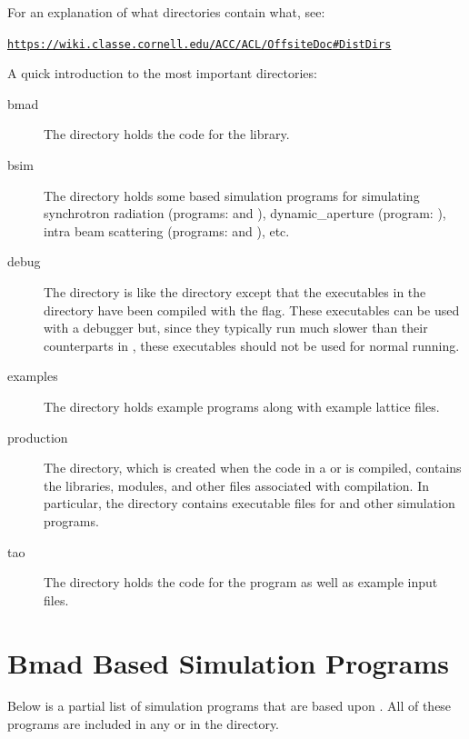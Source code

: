 \documentclass{hitec}
\newenvironment{display}
  {\vspace*{-1.5ex} \begin{alltt}}
  {\end{alltt} \vspace*{-1.0ex}}
\begin{document}
For an explanation of what directories contain what, see:
\begin{display}
  \url{https://wiki.classe.cornell.edu/ACC/ACL/OffsiteDoc#DistDirs}
\end{display}

A quick introduction to the most important directories:
  \begin{description}
  \item[bmad] \Newline
The  directory holds the code for the \bmad library.
  \item[bsim] \Newline
The  directory holds some \bmad based simulation programs for simulating
synchrotron radiation (programs:  and ), dynamic_aperture
(program: ), intra beam scattering (programs:  and
), etc.
  \item[debug] \Newline
The  directory is like the  directory except that the executables
in the  directory have been compiled with the  flag. These executables
can be used with a debugger but, since they typically run much slower than their counterparts in
, these executables should not be used for normal running.
  \item[examples] \Newline
The  directory holds example programs along with example lattice files.
  \item[production] \Newline
The  directory, which is created when the code in a  or
 is compiled, contains the libraries, modules, and other files associated with
compilation. In particular, the  directory contains executable files
for \tao and other simulation programs.

  \item[tao] \Newline
The  directory holds the code for the \tao program as well as example input
files.
  \end{description}

\section{Bmad Based Simulation Programs}

Below is a partial list of simulation programs that are based upon \bmad. All of these
programs are included in any  or  in the 
directory.
\end{document}
